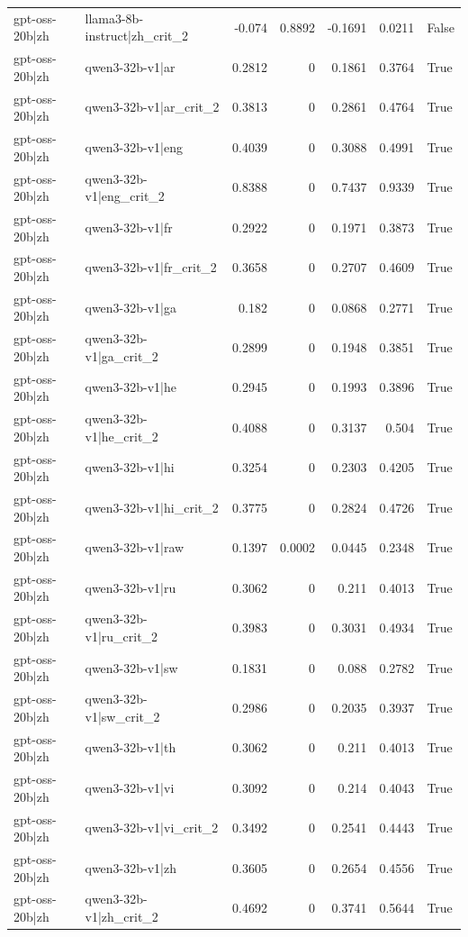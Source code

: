 \begin{table}
\begin{tabular}{l l r r r r l}
gpt-oss-20b|zh & llama3-8b-instruct|zh_crit_2 & -0.074 & 0.8892 & -0.1691 & 0.0211 & False \\
gpt-oss-20b|zh & qwen3-32b-v1|ar & 0.2812 & 0 & 0.1861 & 0.3764 & True \\
gpt-oss-20b|zh & qwen3-32b-v1|ar_crit_2 & 0.3813 & 0 & 0.2861 & 0.4764 & True \\
gpt-oss-20b|zh & qwen3-32b-v1|eng & 0.4039 & 0 & 0.3088 & 0.4991 & True \\
gpt-oss-20b|zh & qwen3-32b-v1|eng_crit_2 & 0.8388 & 0 & 0.7437 & 0.9339 & True \\
gpt-oss-20b|zh & qwen3-32b-v1|fr & 0.2922 & 0 & 0.1971 & 0.3873 & True \\
gpt-oss-20b|zh & qwen3-32b-v1|fr_crit_2 & 0.3658 & 0 & 0.2707 & 0.4609 & True \\
gpt-oss-20b|zh & qwen3-32b-v1|ga & 0.182 & 0 & 0.0868 & 0.2771 & True \\
gpt-oss-20b|zh & qwen3-32b-v1|ga_crit_2 & 0.2899 & 0 & 0.1948 & 0.3851 & True \\
gpt-oss-20b|zh & qwen3-32b-v1|he & 0.2945 & 0 & 0.1993 & 0.3896 & True \\
gpt-oss-20b|zh & qwen3-32b-v1|he_crit_2 & 0.4088 & 0 & 0.3137 & 0.504 & True \\
gpt-oss-20b|zh & qwen3-32b-v1|hi & 0.3254 & 0 & 0.2303 & 0.4205 & True \\
gpt-oss-20b|zh & qwen3-32b-v1|hi_crit_2 & 0.3775 & 0 & 0.2824 & 0.4726 & True \\
gpt-oss-20b|zh & qwen3-32b-v1|raw & 0.1397 & 0.0002 & 0.0445 & 0.2348 & True \\
gpt-oss-20b|zh & qwen3-32b-v1|ru & 0.3062 & 0 & 0.211 & 0.4013 & True \\
gpt-oss-20b|zh & qwen3-32b-v1|ru_crit_2 & 0.3983 & 0 & 0.3031 & 0.4934 & True \\
gpt-oss-20b|zh & qwen3-32b-v1|sw & 0.1831 & 0 & 0.088 & 0.2782 & True \\
gpt-oss-20b|zh & qwen3-32b-v1|sw_crit_2 & 0.2986 & 0 & 0.2035 & 0.3937 & True \\
gpt-oss-20b|zh & qwen3-32b-v1|th & 0.3062 & 0 & 0.211 & 0.4013 & True \\
gpt-oss-20b|zh & qwen3-32b-v1|vi & 0.3092 & 0 & 0.214 & 0.4043 & True \\
gpt-oss-20b|zh & qwen3-32b-v1|vi_crit_2 & 0.3492 & 0 & 0.2541 & 0.4443 & True \\
gpt-oss-20b|zh & qwen3-32b-v1|zh & 0.3605 & 0 & 0.2654 & 0.4556 & True \\
gpt-oss-20b|zh & qwen3-32b-v1|zh_crit_2 & 0.4692 & 0 & 0.3741 & 0.5644 & True \\

\end{tabular}
\end{table}
